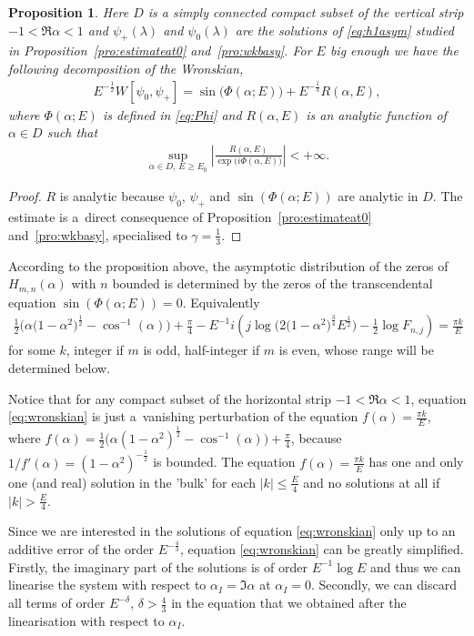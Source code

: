\documentclass[pdftex]{sigma}
\numberwithin{equation}{section}
\newtheorem{pro}[thm]{Proposition}
\newcommand{\la}{\lambda}
\newcommand{\al}{\alpha}
\begin{document}
\begin{pro}\label{pro:wronskian}
	Here $D$ is a simply connected compact subset of the vertical strip $-1<\Re \al <1$ and
	$\psi_+(\la)$ and $\psi_0(\la)$ are the solutions of \eqref{eq:h1asym} studied in Proposition~{\rm \ref{pro:estimateat0}} and~{\rm \ref{pro:wkbasy}}.
	For $E$ big enough we have the following decomposition of the Wronskian,
	\begin{gather}\label{eq:wrdec}
	E^{-\frac12}W[\psi_0,\psi_+]=\sin\big(\Phi(\al;E)\big) + E^{-\frac13} R(\al,E) ,
	\end{gather}
	where $\Phi(\al;E)$ is defined in \eqref{eq:Phi} and
	$R(\al,E)$ is an analytic function of $\al \in D$ such that
	\begin{gather*}
	\sup_{\al \in D,\, E\geq E_0} \left| \frac{R(\al,E)}{\exp{\big( i\Phi(\al,E)\big)}}\right|< +\infty .
	\end{gather*}
\end{pro}
\begin{proof}
	$R$ is analytic because $\psi_0$, $\psi_+$ and $\sin(\Phi(\al;E))$ are analytic in $D$. The estimate is a~direct consequence of Proposition~\ref{pro:estimateat0} and~\ref{pro:wkbasy}, specialised to $\gamma=\frac13$.
\end{proof}

According to the proposition above, the asymptotic distribution of the zeros of $H_{m,n}(\alpha)$ with $n$ bounded is determined by the zeros of the transcendental equation $\sin(\Phi(\al;E))=0$. Equivalently
\begin{gather}
 \frac{1}{2}\big(\al\big(1-\al^2\big)^{\frac12}-\cos^{-1}(\al)\big)+ \frac{\pi}{4}
 - E^{-1} i\left( j \log\big(2\big(1-\al^2\big)^{\frac34}E^{\frac12}\big) -\frac{1}{2} \log F_{n,j} \right) =
\frac{\pi k}{E}\label{eq:wronskian}
\end{gather}
for some $k$, integer if $m$ is odd, half-integer if $m$ is even, whose range will be determined below.

Notice that for any compact subset of the horizontal strip $-1<{\Re} \al <1$, equation \eqref{eq:wronskian} is just a~vanishing perturbation of the equation
$f(\al)=\frac{\pi k}{E}$, where $f(\al)= \frac{1}{2}\big(\al(1-\al^2)^{\frac12}-\cos^{-1}(\al)\big)+\frac{\pi}{4} $, because
$1/f'(\al)=(1-\al^2)^{-\frac12}$ is bounded. The equation $f(\al)=\frac{\pi k}{E}$
has one and only one (and real) solution in the 'bulk' for each $|k|\leq \frac E4$ and no solutions at all if $|k|>\frac E4$.

Since we are interested in the solutions of equation \eqref{eq:wronskian} only up to an additive error of the order $E^{-\frac43}$, equation \eqref{eq:wronskian} can be greatly simplif\/ied. Firstly, the imaginary part of the solutions is of order $E^{-1}\log{E}$ and thus we can linearise the system with respect to $\al_I=\Im \al$ at $\al_I=0$. Secondly, we can discard all terms of order $E^{-\delta}$, $\delta >\frac43$ in the equation that
we obtained after the linearisation with respect to $\al_I$.
\end{document}
